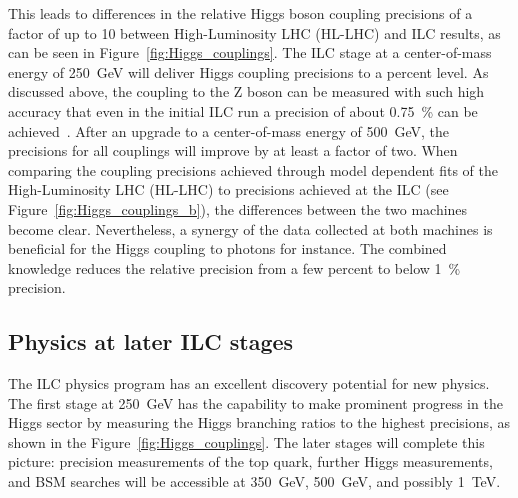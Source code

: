 This leads to differences in the relative Higgs boson coupling precisions of a factor of up to 10 between High-Luminosity LHC (HL-LHC) and ILC results, as can be seen in Figure~\ref{fig:Higgs_couplings}.
The ILC stage at a center-of-mass energy of \SI{250}{\GeV} will deliver Higgs coupling precisions to a percent level.
As discussed above, the coupling to the Z boson can be measured with such high accuracy that even in the initial ILC run a precision of about \SI{0.75}{\percent} can be achieved~\cite[p. 6]{HiggsCouplings_Junping}.
After an upgrade to a center-of-mass energy of \SI{500}{\GeV}, the precisions for all couplings will improve by at least a factor of two.
When comparing the coupling precisions achieved through model dependent fits of the High-Luminosity LHC (HL-LHC) to precisions achieved at the ILC (see Figure~\ref{fig:Higgs_couplings_b}), the differences between the two machines become clear.
Nevertheless, a synergy of the data collected at both machines is beneficial for the Higgs coupling to photons for instance.
The combined knowledge reduces the relative precision from a few percent to below \SI{1}{\percent} precision.

 
\subsection{Physics at later ILC stages}
\label{Physics_later_stages}
The ILC physics program has an excellent discovery potential for new physics.
The first stage at \SI{250}{\GeV} has the capability to make prominent progress in the Higgs sector by measuring the Higgs branching ratios to the highest precisions, as shown in the Figure~\ref{fig:Higgs_couplings}.
The later stages will complete this picture: 
precision measurements of the top quark, further Higgs measurements, and BSM searches will be accessible at \SI{350}{\GeV}, \SI{500}{\GeV}, and possibly \SI{1}{\TeV}.

